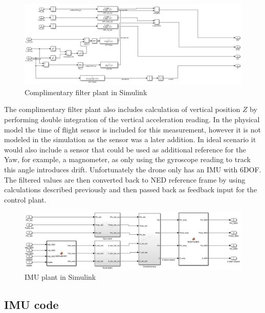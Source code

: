 \begin{figure}[H]
    \begin{center}
    \includegraphics[scale = 0.55]{pictures/IMU/Complimentary_filter_plant.png}
    \end{center}
    \caption{Complimentary filter plant in Simulink}
    \label{fig:my_label}
\end{figure}

The complimentary filter plant also includes calculation of vertical position $Z$ by performing double integration of the vertical acceleration reading. In the physical model the time of flight sensor is included for this measurement, however it is not modeled in the simulation as the sensor was a later addition. In ideal scenario it would also include a sensor that could be used as additional reference for the Yaw, for example, a magnometer, as only using the gyroscope reading to track this angle introduces drift. Unfortunately the drone only has an IMU with 6DOF. 
The filtered values are then converted back to NED reference frame by using calculations described previously and then passed back as feedback input for the control plant.

\begin{figure}[H]
    \begin{center}
    \includegraphics[scale = 0.55]{pictures/IMU/IMU_plant.png}
    \end{center}
    \caption{IMU plant in Simulink}
    \label{fig:my_label}
\end{figure}

\subsection{IMU code}

